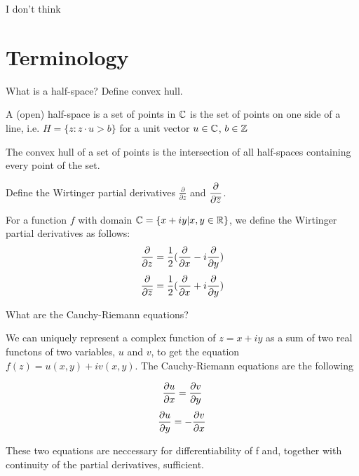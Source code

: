 \documentclass{homework}
\author{Alex Li}
\begin{document}
\maketitle

\begin{inspiration}
I don't think 
\end{inspiration}


\section{Terminology}

\begin{problem}
  What is a half-space?  Define convex hull.
  \end{problem}
  \begin{solution}
  A (open) half-space is a set of points in $\mathbb{C}$ is the set of points on one side of a line, i.e. $H=\{z: z\cdot u > b\}$ for a unit vector $u\in\mathbb{C}$, $b\in\mathbb{Z}$
   
   The convex hull of a set of points is the intersection of all half-spaces containing every point of the set.

   \end{solution}
   \begin{problem}
   Define the Wirtinger partial derivatives $\displaystyle\frac{\partial}{\partial z}$ and $\displaystyle\frac{\partial}{\partial \overline{z}}$.
   \end{problem}
   \begin{solution}
   For a function $f$ with domain $\mathbb{C} = \{x + iy|x, y\in\mathbb{R}\}$, we define the Wirtinger partial derivatives as follows:
   \[\frac{\partial }{\partial z} = \frac{1}{2}(\frac{\partial }{\partial x} - i\frac{\partial }{\partial y})\]
   \[\frac{\partial }{\partial \overline{z}} = \frac{1}{2}(\frac{\partial }{\partial x} + i\frac{\partial }{\partial y})\]
   \end{solution}

   \begin{problem}
     What are the Cauchy-Riemann equations?
     \end{problem}
     We can uniquely represent a complex function of $z = x + iy$ as a sum of two real functons of two variables, $u$ and $v$, to get the equation  $f(z) = u(x, y) + iv(x, y).$
     The Cauchy-Riemann equations are the following
     \begin{solution}
     \[\frac{\partial u}{\partial x} = \frac{\partial v}{\partial y}\label{cauchy-riemann-x-real}\]
     \[\frac{\partial u}{\partial y} = -\frac{\partial v}{\partial x}\label{cauchy-riemann-y-real}\]
     \end{solution}
     These two equations are neccessary for differentiability of f and, together with continuity of the partial derivatives, sufficient. 
\end{document}
